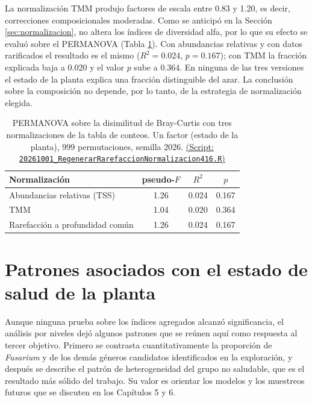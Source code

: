 La normalización TMM produjo factores de escala entre 0.83 y 1.20, es decir, correcciones
composicionales moderadas. Como se anticipó en la Sección \ref{sec:normalizacion}, no altera los
índices de diversidad alfa, por lo que su efecto se evaluó sobre el PERMANOVA
(Tabla \ref{tab:normalizacion-permanova}). Con abundancias relativas y con datos rarificados el
resultado es el mismo ($R^2 = 0.024$, $p = 0.167$); con TMM la fracción explicada baja a 0.020 y el
valor $p$ sube a 0.364. En ninguna de las tres versiones el estado de la planta explica una fracción
distinguible del azar. La conclusión sobre la composición no depende, por lo tanto, de la estrategia
de normalización elegida.

\begin{table}[H]
\centering
\caption{PERMANOVA sobre la disimilitud de Bray-Curtis con tres normalizaciones de la tabla de
conteos. Un factor (estado de la planta), 999 permutaciones, semilla 2026. \href{https://github.com/CamilaSilva1995/Tesis_Maestria/blob/main/Analisis_Comparativo/Fresa_Solena/20261001_RegenerarRarefaccionNormalizacion416.R}{(Script: \texttt{20261001\_RegenerarRarefaccionNormalizacion416.R})}}
\label{tab:normalizacion-permanova}
\begin{tabular}{lccc}
\hline
Normalización & pseudo-$F$ & $R^2$ & $p$ \\
\hline
Abundancias relativas (TSS)      & 1.26 & 0.024 & 0.167 \\
TMM                              & 1.04 & 0.020 & 0.364 \\
Rarefacción a profundidad común  & 1.26 & 0.024 & 0.167 \\
\hline
\end{tabular}
\end{table}

\section[Patrones asociados con el estado de salud]{Patrones asociados con el estado de salud de la planta}
\label{sec:res-patrones}

Aunque ninguna prueba sobre los índices agregados alcanzó significancia, el análisis por niveles
dejó algunos patrones que se reúnen aquí como respuesta al tercer objetivo. Primero se contrasta
cuantitativamente la proporción de \textit{Fusarium} y de los demás géneros candidatos identificados
en la exploración, y después se describe el patrón de heterogeneidad del grupo no saludable, que es
el resultado más sólido del trabajo. Su valor es orientar los modelos y los muestreos futuros que
se discuten en los Capítulos 5 y 6.

